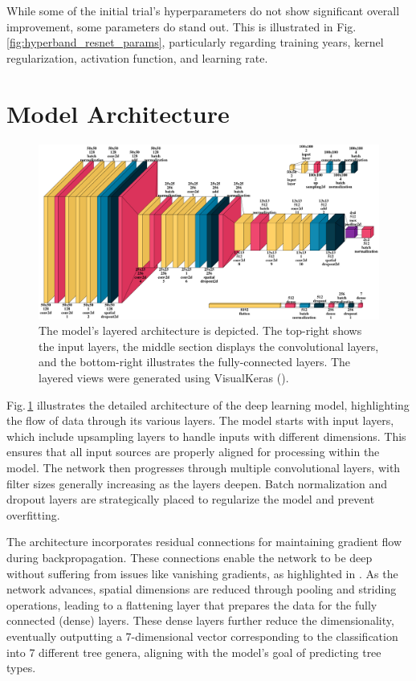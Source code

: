While some of the initial trial's hyperparameters do not show significant overall improvement, some parameters do stand out. This is illustrated in Fig.\,\ref{fig:hyperband_resnet_params}, particularly regarding training years, kernel regularization, activation function, and learning rate.

\section{Model Architecture}

\begin{figure}[ht]
    \centering
    \includegraphics[width=0.9\linewidth]{figures/figures_tuner/model_layered_view.png}
    \caption{The model's layered architecture is depicted. The top-right shows the input layers, the middle section displays the convolutional layers, and the bottom-right illustrates the fully-connected layers. The layered views were generated using VisualKeras (\cite{visualkeras}).}
    \label{fig:model_layered_view}
\end{figure}

Fig.\,\ref{fig:model_layered_view} illustrates the detailed architecture of the deep learning model, highlighting the flow of data through its various layers. The model starts with input layers, which include upsampling layers to handle inputs with different dimensions. This ensures that all input sources are properly aligned for processing within the model. The network then progresses through multiple convolutional layers, with filter sizes generally increasing as the layers deepen. Batch normalization and dropout layers are strategically placed to regularize the model and prevent overfitting.

The architecture incorporates residual connections for maintaining gradient flow during backpropagation. These connections enable the network to be deep without suffering from issues like vanishing gradients, as highlighted in \cite{resnet}. As the network advances, spatial dimensions are reduced through pooling and striding operations, leading to a flattening layer that prepares the data for the fully connected (dense) layers. These dense layers further reduce the dimensionality, eventually outputting a 7-dimensional vector corresponding to the classification into 7 different tree genera, aligning with the model's goal of predicting tree types.
